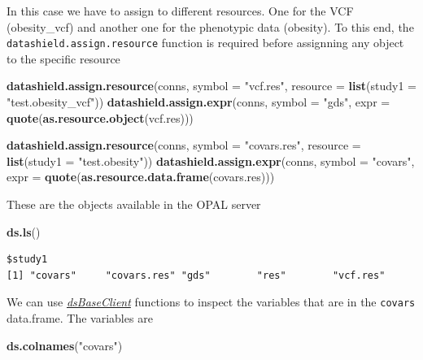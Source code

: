\documentclass[]{article}
\newenvironment{Shaded}{\begin{snugshade}}{\end{snugshade}}
\newcommand{\DataTypeTok}[1]{\textcolor[rgb]{0.13,0.29,0.53}{#1}}
\newcommand{\KeywordTok}[1]{\textcolor[rgb]{0.13,0.29,0.53}{\textbf{#1}}}
\newcommand{\NormalTok}[1]{#1}
\newcommand{\StringTok}[1]{\textcolor[rgb]{0.31,0.60,0.02}{#1}}
\begin{document}
In this case we have to assign to different resources. One for the VCF
(obesity\_vcf) and another one for the phenotypic data (obesity). To
this end, the \texttt{datashield.assign.resource} function is required
before assignning any object to the specific resource

\begin{Shaded}
\begin{Highlighting}[]
\KeywordTok{datashield.assign.resource}\NormalTok{(conns, }\DataTypeTok{symbol =} \StringTok{"vcf.res"}\NormalTok{, }
                           \DataTypeTok{resource =} \KeywordTok{list}\NormalTok{(}\DataTypeTok{study1 =} \StringTok{"test.obesity\_vcf"}\NormalTok{))}
\KeywordTok{datashield.assign.expr}\NormalTok{(conns, }\DataTypeTok{symbol =} \StringTok{"gds"}\NormalTok{, }
                       \DataTypeTok{expr =} \KeywordTok{quote}\NormalTok{(}\KeywordTok{as.resource.object}\NormalTok{(vcf.res)))}


\KeywordTok{datashield.assign.resource}\NormalTok{(conns, }\DataTypeTok{symbol =} \StringTok{"covars.res"}\NormalTok{, }
                           \DataTypeTok{resource =} \KeywordTok{list}\NormalTok{(}\DataTypeTok{study1 =} \StringTok{"test.obesity"}\NormalTok{))}
\KeywordTok{datashield.assign.expr}\NormalTok{(conns, }\DataTypeTok{symbol =} \StringTok{"covars"}\NormalTok{, }
                       \DataTypeTok{expr =} \KeywordTok{quote}\NormalTok{(}\KeywordTok{as.resource.data.frame}\NormalTok{(covars.res)))}
\end{Highlighting}
\end{Shaded}

These are the objects available in the OPAL server

\begin{Shaded}
\begin{Highlighting}[]
\KeywordTok{ds.ls}\NormalTok{()}
\end{Highlighting}
\end{Shaded}

\begin{verbatim}
$study1
[1] "covars"     "covars.res" "gds"        "res"        "vcf.res"   
\end{verbatim}

We can use \emph{\href{https://github.com/datashield}{dsBaseClient}}
functions to inspect the variables that are in the \texttt{covars}
data.frame. The variables are

\begin{Shaded}
\begin{Highlighting}[]
\KeywordTok{ds.colnames}\NormalTok{(}\StringTok{"covars"}\NormalTok{)}
\end{Highlighting}
\end{Shaded}
\end{document}
